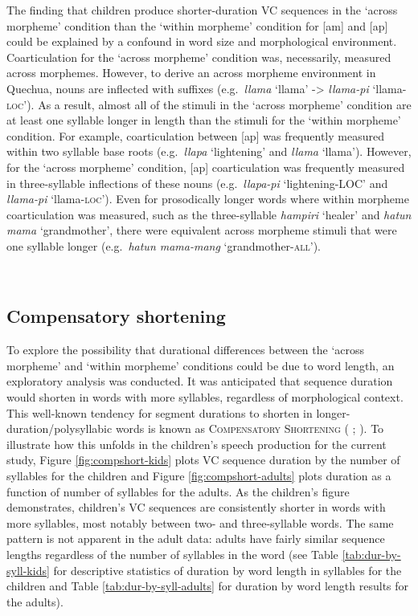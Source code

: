 \documentclass[a4paper,man,floatsintext,natbib,donotrepeattitle, apacite]{apa6}
\begin{document}
The finding that children produce shorter-duration VC sequences in the `across morpheme' condition than the `within morpheme' condition for {[}am{]} and {[}ap{]} could be explained by a confound in word size and morphological environment. Coarticulation for the `across morpheme' condition was, necessarily, measured across morphemes. However, to derive an across morpheme environment in Quechua, nouns are inflected with suffixes (e.g.~\emph{llama} `llama' -\textgreater{} \emph{llama-pi} `llama-\textsc{loc}'). As a result, almost all of the stimuli in the `across morpheme' condition are at least one syllable longer in length than the stimuli for the `within morpheme' condition. For example, coarticulation between {[}ap{]} was frequently measured within two syllable base roots (e.g.~\emph{llapa} `lightening' and \emph{llama} `llama'). However, for the `across morpheme' condition, {[}ap{]} coarticulation was frequently measured in three-syllable inflections of these nouns (e.g.~\emph{llapa-pi} `lightening-LOC' and \emph{llama-pi} `llama-\textsc{loc}'). Even for prosodically longer words where within morpheme coarticulation was measured, such as the three-syllable \emph{hampiri} `healer' and \emph{hatun mama} `grandmother', there were equivalent across morpheme stimuli that were one syllable longer (e.g.~\emph{hatun mama-mang} `grandmother-\textsc{all}').

~
~

\subsection{Compensatory shortening}\label{compensatory-shortening}

To explore the possibility that durational differences between the `across morpheme' and `within morpheme' conditions could be due to word length, an exploratory analysis was conducted. It was anticipated that sequence duration would shorten in words with more syllables, regardless of morphological context. This well-known tendency for segment durations to shorten in longer-duration/polysyllabic words is known as \textsc{Compensatory Shortening} (\citealt{harringtonRelationshipProsodicWeakening2015} \citealt{lehisteTimingUtterancesLinguistic1972}; \citealt{munhallCompensatoryShorteningMonosyllables1992}). To illustrate how this unfolds in the children's speech production for the current study, Figure \ref{fig:compshort-kids} plots VC sequence duration by the number of syllables for the children and Figure \ref{fig:compshort-adults} plots duration as a function of number of syllables for the adults. As the children's figure demonstrates, children's VC sequences are consistently shorter in words with more syllables, most notably between two- and three-syllable words. The same pattern is not apparent in the adult data: adults have fairly similar sequence lengths regardless of the number of syllables in the word (see Table \ref{tab:dur-by-syll-kids} for descriptive statistics of duration by word length in syllables for the children and Table \ref{tab:dur-by-syll-adults} for duration by word length results for the adults).
\end{document}
